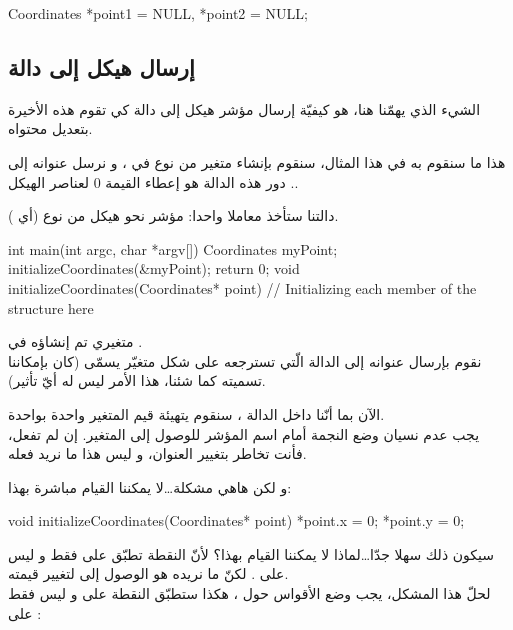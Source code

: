 \begin{Csource}
Coordinates *point1 = NULL, *point2 = NULL;
\end{Csource}

\subsection{إرسال هيكل إلى دالة}

الشيء الذي يهمّنا هنا، هو كيفيّة إرسال مؤشر هيكل إلى دالة كي تقوم هذه الأخيرة بتعديل محتواه.

هذا ما سنقوم به في هذا المثال، سنقوم بإنشاء متغير من نوع
في
،
و نرسل عنوانه إلى
.
دور هذه الدالة هو إعطاء القيمة 0 لعناصر الهيكل.

دالتنا
ستأخذ معاملا واحدا: مؤشر نحو هيكل من نوع
(أي
).

\begin{Csource}
int main(int argc, char *argv[])
{
	Coordinates myPoint;
	initializeCoordinates(&myPoint);
	return 0;
}
void initializeCoordinates(Coordinates* point)
{
	// Initializing each member of the structure here
}
\end{Csource}

متغيري
تم إنشاؤه في
.\\
نقوم بإرسال عنوانه إلى الدالة
الّتي تسترجعه على شكل متغيّر يسمّى
(كان بإمكاننا تسميته كما شئنا، هذا الأمر ليس له أيّ تأثير).

الآن بما أنّنا داخل الدالة
،
سنقوم يتهيئة قيم المتغير
واحدة بواحدة.\\
يجب عدم نسيان وضع النجمة أمام اسم المؤشر للوصول إلى المتغير. إن لم تفعل، فأنت تخاطر بتغيير العنوان، و ليس هذا ما نريد فعله.

و لكن هاهي مشكلة\dots لا يمكننا القيام مباشرة بهذا:

\begin{Csource}
void initializeCoordinates(Coordinates* point)
{
	*point.x = 0;
	*point.y = 0;
}
\end{Csource}

سيكون ذلك سهلا جدّا\dots لماذا لا يمكننا القيام بهذا؟
لأنّ النقطة تطبّق على
فقط و ليس على
.
لكنّ ما نريده هو الوصول إلى
لتغيير قيمته.\\
لحلّ هذا المشكل، يجب وضع الأقواس حول
،
هكذا ستطبّق النقطة على
و ليس فقط على
:

